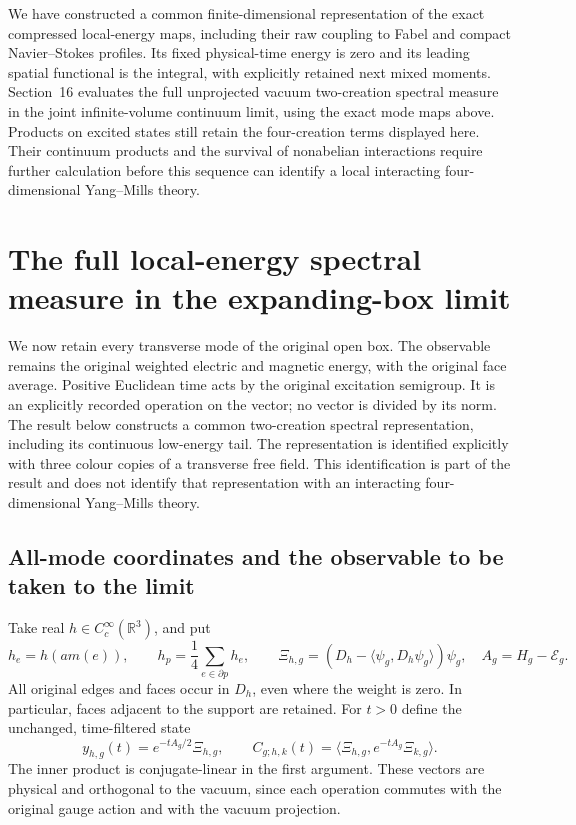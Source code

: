 \documentclass[11pt]{article}
\begin{document}
We have constructed a common finite-dimensional representation of
the exact compressed local-energy maps, including their raw coupling
to Fabel and compact Navier--Stokes profiles. Its fixed physical-time
energy is zero and its leading spatial functional is the integral,
with explicitly retained next mixed moments. Section~16 evaluates
the full unprojected vacuum two-creation spectral measure in the
joint infinite-volume continuum limit, using the exact mode maps
above. Products on excited states still retain the four-creation
terms displayed here. Their continuum products and the survival of
nonabelian interactions require further calculation before this
sequence can identify a local interacting four-dimensional
Yang--Mills theory.

\section{The full local-energy spectral measure in the expanding-box limit}
\label{sec:full-local-spectrum}

We now retain every transverse mode of the original open box. The
observable remains the original weighted electric and magnetic energy,
with the original face average. Positive Euclidean time acts by the
original excitation semigroup. It is an explicitly recorded operation
on the vector; no vector is divided by its norm. The result below
constructs a common two-creation spectral representation, including its
continuous low-energy tail. The representation is identified explicitly
with three colour copies of a transverse free field. This identification
is part of the result and does not identify that representation with an
interacting four-dimensional Yang--Mills theory.

\subsection{All-mode coordinates and the observable to be taken to the limit}

Take real $h\in C_c^\infty(\mathbb R^3)$, and put
\[
 h_e=h(a m(e)),\qquad h_p=\frac14\sum_{e\in\partial p}h_e,\qquad
 \Xi_{h,g}=(D_h-\langle\psi_g,D_h\psi_g\rangle)\psi_g,
 \quad A_g=H_g-\mathcal E_g .
\]
All original edges and faces occur in $D_h$, even where the weight is
zero. In particular, faces adjacent to the support are retained. For
$t>0$ define the unchanged, time-filtered state
\begin{equation}\label{eq:full-damped-state}
 y_{h,g}(t)=e^{-tA_g/2}\Xi_{h,g},\qquad
 C_{g;h,k}(t)=\langle\Xi_{h,g},e^{-tA_g}\Xi_{k,g}\rangle.
\end{equation}
The inner product is conjugate-linear in the first argument. These
vectors are physical and orthogonal to the vacuum, since each operation
commutes with the original gauge action and with the vacuum projection.
\end{document}
